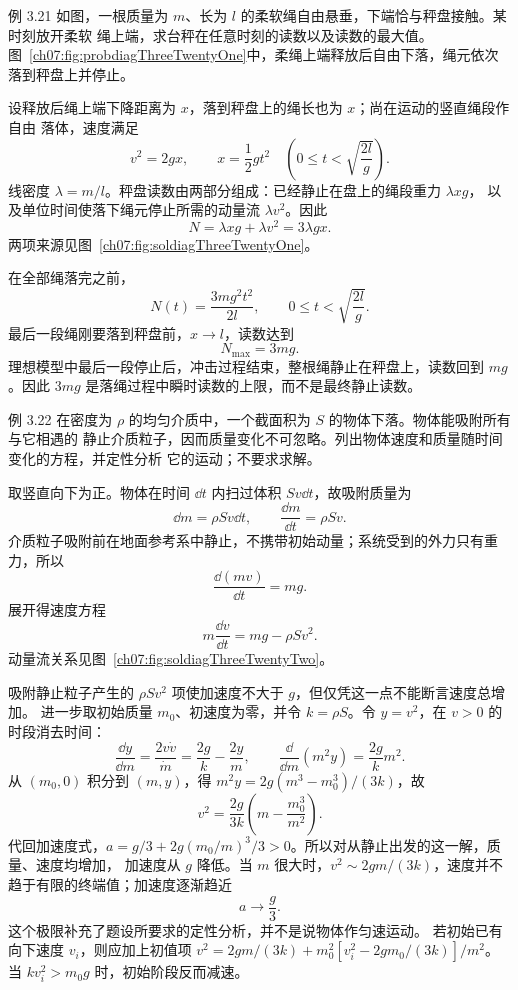 \Needspace{0.32\textheight}
\begin{origexamplebox}{例 3.21}
如图，一根质量为 $m$、长为 $l$ 的柔软绳自由悬垂，下端恰与秤盘接触。某时刻放开柔软
绳上端，求台秤在任意时刻的读数以及读数的最大值。
图~\ref{ch07:fig:probdiagThreeTwentyOne}中，柔绳上端释放后自由下落，绳元依次落到秤盘上并停止。
\probdiagThreeTwentyOne
\end{origexamplebox}

\begin{xesolution}
设释放后绳上端下降距离为 $x$，落到秤盘上的绳长也为 $x$；尚在运动的竖直绳段作自由
落体，速度满足
\[
 v^2=2gx,
 \qquad
 x=\frac12gt^2
 \quad\left(0\le t<\sqrt{\frac{2l}{g}}\right).
\]
线密度 $\lambda=m/l$。秤盘读数由两部分组成：已经静止在盘上的绳段重力 $\lambda xg$，
以及单位时间使落下绳元停止所需的动量流 $\lambda v^2$。因此
\[
 N=\lambda xg+\lambda v^2
 =3\lambda gx.
\]
两项来源见图~\ref{ch07:fig:soldiagThreeTwentyOne}。

\soldiagThreeTwentyOne
在全部绳落完之前，
\[
 \boxed{N(t)=\frac{3mg^2t^2}{2l}},
 \qquad
 0\le t<\sqrt{\frac{2l}{g}}.
\]
最后一段绳刚要落到秤盘前，$x\to l$，读数达到
\[
 \boxed{N_{\max}=3mg}.
\]
理想模型中最后一段停止后，冲击过程结束，整根绳静止在秤盘上，读数回到 $mg$。因此
$3mg$ 是落绳过程中瞬时读数的上限，而不是最终静止读数。
\end{xesolution}

\begin{origexamplebox}{例 3.22}
在密度为 $\rho$ 的均匀介质中，一个截面积为 $S$ 的物体下落。物体能吸附所有与它相遇的
静止介质粒子，因而质量变化不可忽略。列出物体速度和质量随时间变化的方程，并定性分析
它的运动；不要求求解。
\end{origexamplebox}

\begin{xesolution}
取竖直向下为正。物体在时间 $\dd t$ 内扫过体积 $Sv\dd t$，故吸附质量为
\[
 \dd m=\rho Sv\dd t,
 \qquad
 \boxed{\frac{\dd m}{\dd t}=\rho Sv}.
\]
介质粒子吸附前在地面参考系中静止，不携带初始动量；系统受到的外力只有重力，所以
\[
 \boxed{\frac{\dd(mv)}{\dd t}=mg}.
\]
展开得速度方程
\[
 \boxed{m\frac{\dd v}{\dd t}=mg-\rho Sv^2}.
\]
动量流关系见图~\ref{ch07:fig:soldiagThreeTwentyTwo}。

\soldiagThreeTwentyTwo
吸附静止粒子产生的 $\rho Sv^2$ 项使加速度不大于 $g$，但仅凭这一点不能断言速度总增加。
进一步取初始质量 $m_0$、初速度为零，并令 $k=\rho S$。令 $y=v^2$，在 $v>0$ 的时段消去时间：
\[
 \frac{\dd y}{\dd m}=\frac{2v\dot v}{\dot m}
 =\frac{2g}{k}-\frac{2y}{m},\qquad
 \frac{\dd}{\dd m}(m^2y)=\frac{2g}{k}m^2.
\]
从 $(m_0,0)$ 积分到 $(m,y)$，得 $m^2y=2g(m^3-m_0^3)/(3k)$，故
\[
 v^2=\frac{2g}{3k}\left(m-\frac{m_0^3}{m^2}\right).
\]
代回加速度式，$a=g/3+2g(m_0/m)^3/3>0$。所以对从静止出发的这一解，质量、速度均增加，
加速度从 $g$ 降低。当 $m$ 很大时，$v^2\sim2gm/(3k)$，速度并不趋于有限的终端值；加速度逐渐趋近
\[
 \boxed{a\to\frac{g}{3}}.
\]
这个极限补充了题设所要求的定性分析，并不是说物体作匀速运动。
若初始已有向下速度 $v_i$，则应加上初值项
$v^2=2gm/(3k)+m_0^2[v_i^2-2gm_0/(3k)]/m^2$。当 $kv_i^2>m_0g$ 时，初始阶段反而减速。
\end{xesolution}

